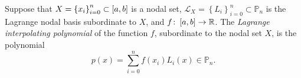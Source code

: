 \begin{frame}
	\begin{definition}
		Suppose that
		\begin{math}
			X={\left\{x_{i}\right\}}_{i=0}^{n}\subset
			\left[a,b\right]
		\end{math}
		is a nodal set,
		\begin{math}
			\mathcal{L}_{X}=
			{\left\{L_{i}\right\}}_{i=0}^{n}
			\subset
			\mathbb{P}_{n}
		\end{math}
		is the Lagrange nodal basis subordinate to $X$, and
		\begin{math}
			f\colon
			\left[a,b\right]\to
			\mathbb{R}
		\end{math}.
		The \emph{Lagrange interpolating polynomial} of the function
		$f$, subordinate to the nodal set $X$, is the polynomial
		\begin{equation*}
			p\left(x\right)=
			\sum_{i=0}^{n}
			f\left(x_{i}\right)
			L_{i}\left(x\right)\in
			\mathbb{P}_{n}.
		\end{equation*}
	\end{definition}
\end{frame}

